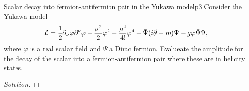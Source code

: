 \begin{problem}{Scalar decay into fermion-antifermion pair in the Yukawa model}{p3}
   Consider the Yukawa model
   \begin{equation*}
      \mathcal{L} = \frac12 \partial_\nu \varphi \partial^\nu \varphi - \frac{\mu^2}{2} \varphi^2 - \frac{\mu^2}{4!} \varphi^4 + \bar{\Psi} (i \slashed{\partial} - m) \Psi - g \varphi \bar{\Psi} \Psi,
   \end{equation*}
   where \(\varphi\) is a real scalar field and \(\Psi\) a Dirac fermion. Evalueate the amplitude for the decay of the scalar into a fermion-antifermion pair where these are in helicity states.
\end{problem}
\begin{proof}[Solution]
    
\end{proof}
